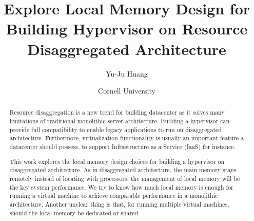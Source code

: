 \documentclass[twocolumn]{article}
\title{Explore Local Memory Design for Building Hypervisor on Resource Disaggregated Architecture}
\author{Yu-Ju Huang}
\date{Cornell University}
\begin{document}
\maketitle

\begin{abstract}
Resource disaggregation is a new trend for building datacenter as it solves many limitations of traditional monolithic server architecture. Building a hypervisor can provide full compatibility to enable legacy applications to run on disaggregated architecture. Furthermore, virtualization functionality is usually an important feature a datacenter should possess, to support Infrastructure as a Service (IaaS) for instance.

This work explores the local memory design choices for building a hypervisor on disaggregated architecture. As in disaggregated architecture, the main memory stays remotely instead of locating with processors, the management of local memory will be the key system performance. We try to know how much local memory is enough for running a virtual machine to achieve comparable performance in a monolithic architecture. Another unclear thing is that, for running multiple virtual machines, should the local memory be dedicated or shared.

\end{abstract}

\iffalse
\begin{figure*}[h!]
  \subcaptionbox{Monolithic architecture, hardware components are bounded within a machine.\label{fig:monolithic}}[.3\textwidth]{\texttt{[image: figures/monolithic.png]}}
  \subcaptionbox{Disaggregated architecture, hardware components are separate: there are CPU-blade, memory-blade, storage-blade. We also assume there is local memory located with CPU.\label{fig:disaggregated}}[.7\textwidth]{\texttt{[image: figures/disaggregated.png]}}
  \caption{Monolithic architecture and disaggregated architecture.}
  \label{fig:architecture}
\end{figure*}
\fi
\end{document}
